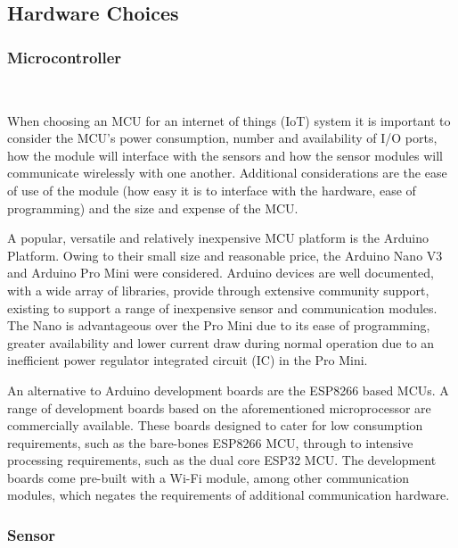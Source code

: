 \documentclass[10pt,twocolumn]{witseiepaper}
\begin{document}
	\subsection{Hardware Choices} 
	
		\subsubsection{Microcontroller} $   $
		
			When choosing an MCU for an internet of things (IoT) system it is important to consider the MCU's power consumption, number and availability of I/O ports, how the module will interface with the sensors and how the sensor modules will communicate wirelessly with one another. Additional considerations are the ease of use of the module (how easy it is to interface with the hardware, ease of programming) and the size and expense of the MCU.
			
			A popular, versatile and relatively inexpensive MCU platform is the Arduino Platform. Owing to their small size and reasonable price, the Arduino Nano V3 and Arduino Pro Mini were considered. Arduino devices are well documented, with a wide array of libraries, provide through extensive community support, existing to support a range of inexpensive sensor and communication modules. The Nano is advantageous over the Pro Mini due to its ease of programming, greater availability and lower current draw during normal operation due to an inefficient power regulator integrated circuit (IC) in the Pro Mini.

			An alternative to Arduino development boards are the ESP8266 based MCUs. A range of development boards based on the aforementioned microprocessor are commercially available. These boards designed to cater for low consumption requirements, such as the bare-bones ESP8266 MCU, through to intensive processing requirements, such as the dual core ESP32 MCU. The development boards come pre-built with a Wi-Fi module, among other communication modules, which negates the requirements of additional communication hardware.
			
		\subsubsection{Sensor} $   $
			
\end{document}
